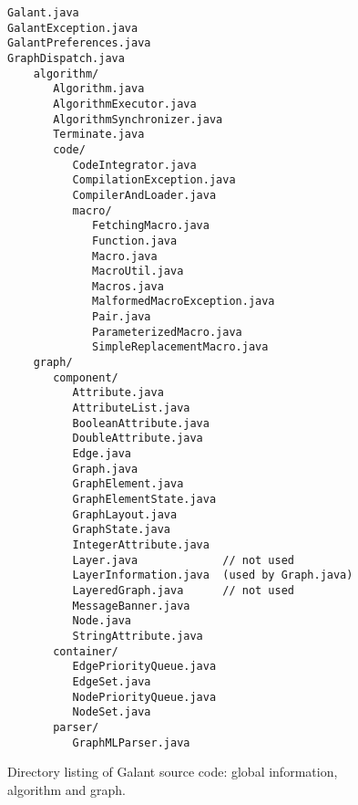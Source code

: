 \begin{figure}

  \begin{center}
      \begin{minipage}{4in}
  \small
\begin{verbatim}
Galant.java
GalantException.java
GalantPreferences.java
GraphDispatch.java
    algorithm/
       Algorithm.java
       AlgorithmExecutor.java
       AlgorithmSynchronizer.java
       Terminate.java
       code/
          CodeIntegrator.java
          CompilationException.java
          CompilerAndLoader.java
          macro/
             FetchingMacro.java
             Function.java
             Macro.java
             MacroUtil.java
             Macros.java
             MalformedMacroException.java
             Pair.java
             ParameterizedMacro.java
             SimpleReplacementMacro.java
    graph/
       component/
          Attribute.java
          AttributeList.java
          BooleanAttribute.java
          DoubleAttribute.java
          Edge.java
          Graph.java
          GraphElement.java
          GraphElementState.java
          GraphLayout.java
          GraphState.java
          IntegerAttribute.java
          Layer.java             // not used
          LayerInformation.java  (used by Graph.java)
          LayeredGraph.java      // not used
          MessageBanner.java
          Node.java
          StringAttribute.java
       container/
          EdgePriorityQueue.java
          EdgeSet.java
          NodePriorityQueue.java
          NodeSet.java
       parser/
          GraphMLParser.java
\end{verbatim}
      \end{minipage}
  \end{center}

  \medskip
  \caption{Directory listing of Galant source code: global information,
    algorithm and graph.}
  \label{fig:directory_listing_graph}
\end{figure}

